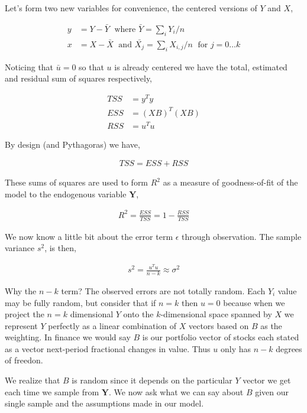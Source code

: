 Let's form two new variables for convenience, the centered versions of $Y$ and $X$,

\begin{align*}
y &= Y - \bar{Y} \;\text{ where } \bar{Y} = \sum_i Y_i/n\\
x &= X - \bar{X} \;\text{ and } \bar{X_j} = \sum_i X_{i,j} / n \;\text{ for } j = 0 \dots k
\end{align*}

Noticing that $\bar{u} = 0$ so that $u$ is already centered we have the total, estimated and residual sum of squares respectively,

\begin{align*}
TSS &= y^Ty\\
ESS &= (XB)^T(XB)\\
RSS &= u^Tu
\end{align*}

By design (and Pythagoras) we have,

\begin{align*}
TSS = ESS + RSS
\end{align*}

These sums of squares are used to form $R^2$ as a measure of goodness-of-fit of the model to the endogenous variable $\mathbf{Y}$,

\begin{align}
\label{eq:R2} R^2 = \frac{ESS}{TSS} = 1 - \frac{RSS}{TSS}
\end{align}

We now know a little bit about the error term $\epsilon$ through observation. 
The sample variance $s^2$, is then,

\begin{align}
\label{eq:s2} s^2 = \frac{u^Tu}{n-k} \approx \sigma^2
\end{align}

Why the $n-k$ term? The observed errors are not totally random. Each $Y_i$ value may be fully random, but consider that if $n=k$ then $u = 0$ because when we project the $n=k$ dimensional $Y$ onto the $k$-dimensional space spanned by $X$ we represent $Y$ perfectly as a linear combination of $X$ vectors based on $B$ as the weighting. In finance we would say $B$ is our portfolio vector of stocks each stated as a vector next-period fractional changes in value. Thus $u$ only has $n-k$ degrees of freedon.

We realize that $B$ is random since it depends on the particular $Y$ vector we get each time we sample from $\mathbf{Y}$. We now ask what we can say about $B$ given our single sample and the assumptions made in our model.

